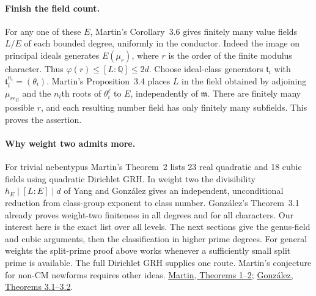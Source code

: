 \paragraph{Finish the field count.}
For any one of these $E$, Martin's Corollary~3.6 gives finitely many
value fields $L/E$ of each bounded degree, uniformly in the conductor.
Indeed the image on principal ideals generates $E(\mu_r)$, where $r$
is the order of the finite modulus character. Thus
$\varphi(r)\leq [L:\mathbb Q]\leq 2d$. Choose ideal-class generators
$\mathfrak t_i$ with $\mathfrak t_i^{n_i}=(\theta_i)$.
Martin's Proposition~3.4 places $L$ in the field obtained by adjoining
$\mu_{r e_E}$ and the $n_i$th roots of $\theta_i^\ell$ to $E$, independently
of $\mathfrak m$. There are finitely many possible $r$, and each resulting
number field has only finitely many subfields. This proves the assertion.

\paragraph{Why weight two admits more.}
For trivial nebentypus Martin's Theorem~2 lists 23 real quadratic and 18 cubic
fields using quadratic Dirichlet GRH. In weight two the divisibility
$h_E\mid[L:E]\mid d$ of Yang and Gonz\'alez gives an independent, unconditional
reduction from class-group exponent to class number. Gonz\'alez's Theorem~3.1
already proves weight-two finiteness in all degrees and for all characters.
Our interest here is the exact list over all levels. The next sections give the
genus-field and cubic arguments, then the classification in higher prime degrees.
For general weights the split-prime proof above works whenever a
sufficiently small split prime is available. The full Dirichlet GRH supplies
one route. Martin's conjecture for non-CM newforms requires other ideas.
\href{https://arxiv.org/pdf/2509.24119v2}{Martin, Theorems 1--2};
\href{https://ems.press/content/serial-article-files/38349}{Gonz\'alez, Theorems 3.1--3.2}.
